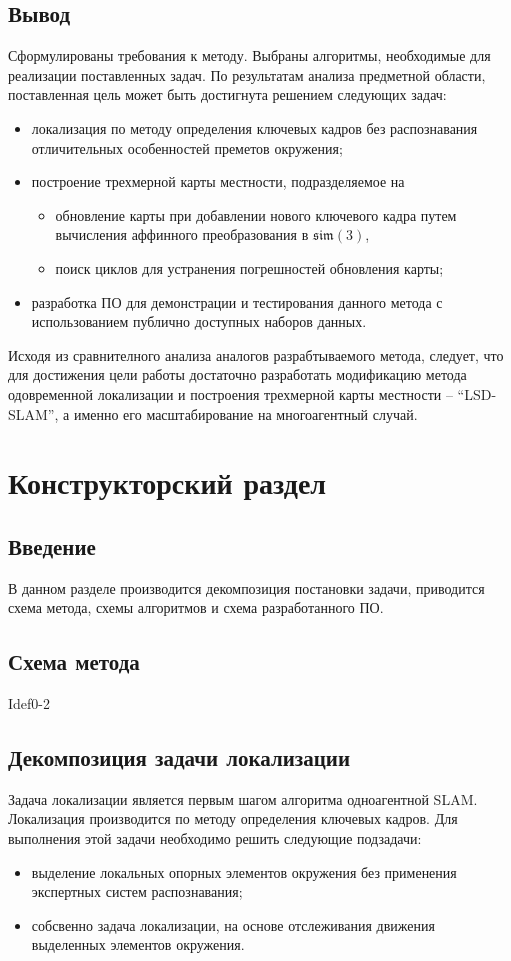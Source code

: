 \subsection{Вывод}
Сформулированы требования к методу. Выбраны алгоритмы, необходимые для реализации поставленных задач. По результатам анализа предметной области, поставленная цель может быть достигнута решением следующих задач:
\begin{itemize}
    \item локализация по методу определения ключевых кадров без распознавания отличительных особенностей преметов окружения;
    \item построение трехмерной карты местности, подразделяемое на
    \begin{itemize}
        \item обновление карты при добавлении нового ключевого кадра путем вычисления аффинного преобразования в $\mathfrak{sim}(3)$,
        \item поиск циклов для устранения погрешностей обновления карты;
    \end{itemize}
    \item разработка ПО для демонстрации и тестирования данного метода с использованием публично доступных наборов данных.
\end{itemize}
Исходя из сравнителного анализа аналогов разрабтываемого метода, следует, что для достижения цели работы достаточно разработать модификацию метода одовременной локализации и построения трехмерной карты местности -- ``LSD-SLAM'', а именно его масштабирование на многоагентный случай.



\section{Конструкторский раздел}
\subsection{Введение}
В данном разделе производится декомпозиция постановки задачи, приводится схема метода, схемы алгоритмов и схема разработанного ПО.

\subsection{Схема метода}
Idef0-2

\subsection{Декомпозиция задачи локализации}
Задача локализации является первым шагом алгоритма одноагентной SLAM. Локализация производится по методу определения ключевых кадров. Для выполнения этой задачи необходимо решить следующие подзадачи:
\begin{itemize}
    \item выделение локальных опорных элементов окружения без применения экспертных систем распознавания;
    \item собсвенно задача локализации, на основе отслеживания движения выделенных элементов окружения.
\end{itemize}


